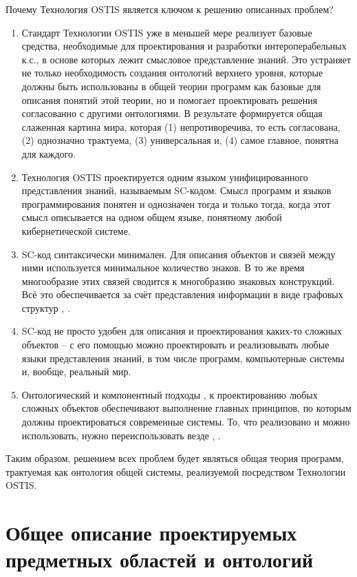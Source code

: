 Почему Технология OSTIS является ключом к решению описанных проблем?
\begin{enumerate}
    \item {Стандарт Технологии OSTIS \cite{Standard2021} уже в меньшей мере реализует базовые средства, необходимые для проектирования и разработки интероперабельных к.с., в основе которых лежит смысловое представление знаний. Это устраняет не только необходимость создания онтологий верхнего уровня, которые должны быть использованы в общей теории программ как базовые для описания понятий этой теории, но и помогает проектировать решения согласованно с другими онтологиями. В результате формируется общая слаженная картина мира, которая (1) непротиворечива, то есть согласована, (2) однозначно трактуема, (3) универсальная и, (4) самое главное, понятна для каждого.}
    \item {Технология OSTIS проектируется одним языком унифицированного представления знаний, называемым SC-кодом. Смысл программ и языков программирования понятен и однозначен тогда и только тогда, когда этот смысл описывается на одном общем языке, понятному любой кибернетической системе.}
    \item {SC-код синтаксически минимален. Для описания объектов и связей между ними используется минимальное количество знаков. В то же время многообразие этих связей сводится к многобразию знаковых конструкций. Всё это обеспечивается за счёт представления информации в виде графовых структур \cite{Kasyanov2003}, \cite{Petrov1978}.}
    \item {SC-код не просто удобен для описания и проектирования каких-то сложных объектов -- с его помощью можно проектировать и реализовывать любые языки представления знаний, в том числе программ, компьютерные системы и, вообще, реальный мир.}
    \item {Онтологический и компонентный подходы \cite{Sales2022}, \cite{Samaa2020} к проектированию любых сложных объектов обеспечивают выполнение главных принципов, по которым должны проектироваться современные системы. То, что реализовано и можно использовать, нужно переиспользовать везде \cite{O4IS2007}, \cite{Molorodov2019}.}
\end{enumerate}

Таким образом, решением всех проблем будет являться общая теория программ, трактуемая как онтология общей системы, реализуемой посредством Технологии OSTIS.

\section{Общее описание проектируемых предметных областей и онтологий}

